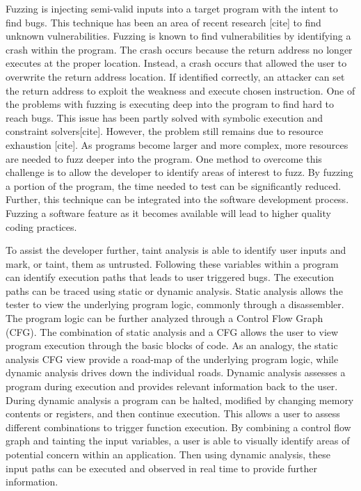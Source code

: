 \documentclass[conference]{IEEEtran}
\begin{document}
Fuzzing is injecting semi-valid inputs into a target program with the intent to find bugs. This technique has been an area of recent research [cite] to find unknown vulnerabilities. Fuzzing is known to find vulnerabilities by identifying a crash within the program. The crash occurs because the return address no longer executes at the proper location. Instead, a crash occurs that allowed the user to overwrite the return address location. If identified correctly, an attacker can set the return address to exploit the weakness and execute chosen instruction. One of the problems with fuzzing is executing deep into the program to find hard to reach bugs. This issue has been partly solved with symbolic execution and constraint solvers[cite]. However, the problem still remains due to resource exhaustion [cite]. As programs become larger and more complex, more resources are needed to fuzz deeper into the program. One method to overcome this challenge is to allow the developer to identify areas of interest to fuzz. By fuzzing a portion of the program, the time needed to test can be significantly reduced. Further, this technique can be integrated into the software development process. Fuzzing a software feature as it becomes available will lead to higher quality coding practices. 

To assist the developer further, taint analysis is able to identify user inputs and mark, or taint, them as untrusted. Following these variables within a program can identify execution paths that leads to user triggered bugs. The execution paths can be traced using static or dynamic analysis. Static analysis allows the tester to view the underlying program logic, commonly through a disassembler. The program logic can be further analyzed through a Control Flow Graph (CFG). The combination of static analysis and a CFG allows the user to view program execution through the basic blocks of code. As an analogy, the static analysis CFG view provide a road-map of the underlying program logic, while dynamic analysis drives down the individual roads. Dynamic analysis assesses a program during execution and provides relevant information back to the user. During dynamic analysis a program can be halted, modified by changing memory contents or registers, and then continue execution. This allows a user to assess different combinations to trigger function execution. By combining a control flow graph and tainting the input variables, a user is able to visually identify areas of potential concern within an application. Then using dynamic analysis, these input paths can be executed and observed in real time to provide further information. 
\end{document}

